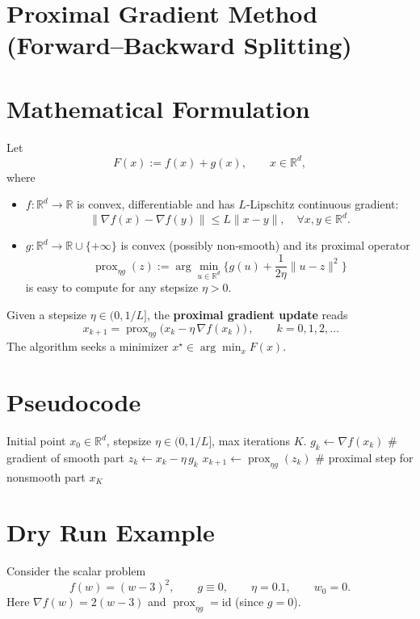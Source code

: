 \documentclass{article}
\newcommand{\prox}{\operatorname{prox}}
\newcommand{\grad}{\nabla}
\begin{document}
\section*{Proximal Gradient Method (Forward–Backward Splitting)}

\section*{Mathematical Formulation}
Let 
\[
F(x):=f(x)+g(x),\qquad x\in\mathbb{R}^d,
\]
where  

\begin{itemize}[noitemsep]
\item $f:\mathbb{R}^d\to\mathbb{R}$ is convex, differentiable and has $L$‑Lipschitz continuous gradient:
\[
\|\grad f(x)-\grad f(y)\|\le L\|x-y\|,\quad\forall x,y\in\mathbb{R}^d .
\]
\item $g:\mathbb{R}^d\to\mathbb{R}\cup\{+\infty\}$ is convex (possibly non‑smooth) and its proximal operator
\[
\prox_{\eta g}(z):=\arg\min_{u\in\mathbb{R}^d}\Big\{ g(u)+\frac{1}{2\eta}\|u-z\|^2\Big\}
\]
is easy to compute for any stepsize $\eta>0$.
\end{itemize}

Given a stepsize $\eta\in(0,1/L]$, the \textbf{proximal gradient update} reads
\begin{equation}
\boxed{\,x_{k+1}= \prox_{\eta g}\!\big(x_k-\eta \,\grad f(x_k)\big)\,},\qquad k=0,1,2,\dots
\tag{PG}
\end{equation}
The algorithm seeks a minimizer $x^\star\in\arg\min_{x}F(x)$.

\section*{Pseudocode}
\begin{algorithm}[H]
\caption{Proximal Gradient Method}
\begin{algorithmic}[1]
\REQUIRE Initial point $x_0\in\mathbb{R}^d$, stepsize $\eta\in(0,1/L]$, max iterations $K$.
    \STATE $g_k \gets \grad f(x_k)$ \hfill\# gradient of smooth part
    \STATE $z_k \gets x_k - \eta\, g_k$
    \STATE $x_{k+1} \gets \prox_{\eta g}(z_k)$ \hfill\# proximal step for nonsmooth part
\ENDFOR
\RETURN $x_K$
\end{algorithmic}
\end{algorithm}

\section*{Dry Run Example}
Consider the scalar problem 
\[
f(w)=(w-3)^2,\qquad g\equiv0,\qquad \eta=0.1,\qquad w_0=0 .
\]
Here $\grad f(w)=2(w-3)$ and $\prox_{\eta g}= \text{id}$ (since $g=0$).
\end{document}
